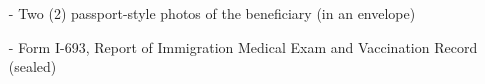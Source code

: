 \label{I-485}

\label{passport}

\label{birth}

\label{i94}

\label{visas}

\label{plans}


\label{end}
\vspace*{\fill}
\begin{center}
	{\Large \bf
		\begin{itemize}
			\item[-] Two (2) passport-style photos of the beneficiary (in an envelope)
			\item[-] Form I-693, Report of Immigration Medical Exam and Vaccination Record (sealed)
		\end{itemize}
	}
\end{center}
\vspace*{\fill}